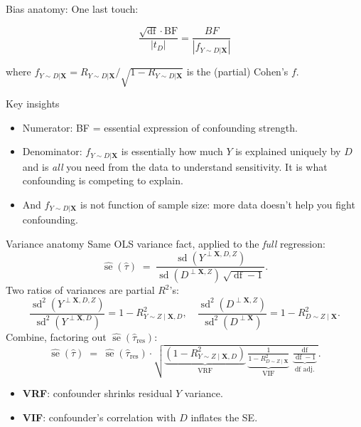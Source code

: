 \documentclass[xcolor=dvipsnames]{beamer}
\newcommand\X{{\bm X}}
\DeclareMathOperator{\sd}{sd}
\DeclareMathOperator{\se}{se}
\DeclareMathOperator{\df}{df}
\DeclareMathOperator{\bias}{bias}
\begin{document}
\begin{frame}{Bias anatomy:}
One last touch: 

\[ \frac{\sqrt{\df}\cdot \text{BF}}{|t_D|} = \frac{BF}{| f_{Y\sim D|\X}|} \]

\noindent where $f_{Y\sim D|\X} = R_{Y\sim D | \X}/\sqrt{1-R_{Y\sim D | \X}}$ is the (partial) Cohen's $f$.\\
\bigskip



  Key insights \\
\small
\begin{itemize}
\item Numerator:  BF = essential expression of confounding strength.  
\item Denominator: $f_{Y\sim D|\X}$ is essentially how much $Y$ is explained uniquely by $D$ and is \textit{all} you need from the data to understand sensitivity.  It is what confounding is competing to explain.
\item  And $f_{Y\sim D|\X}$ is not function of sample size: more data doesn't help you fight confounding.
\end{itemize}
\end{frame}


\begin{frame}{Variance anatomy}
\small
{} Same OLS variance fact, applied to the \textit{full} regression:
\[
\widehat{\se}(\hat{\tau}) \;=\; \frac{\sd(Y^{\perp \X, D, Z})}{\sd(D^{\perp \X, Z})\,\sqrt{\df - 1}}.
\]
 Two ratios of variances are partial $R^2$'s:
\[
\frac{\sd^2(Y^{\perp \X, D, Z})}{\sd^2(Y^{\perp \X, D})} = 1 - R^2_{Y\sim Z \mid \X, D}, \quad
\frac{\sd^2(D^{\perp \X, Z})}{\sd^2(D^{\perp \X})} = 1 - R^2_{D\sim Z \mid \X}.
\]
 Combine, factoring out $\widehat{\se}(\hat{\tau}_{\text{res}})$:
\[
\widehat{\se}(\hat{\tau}) \;=\; \widehat{\se}(\hat{\tau}_{\text{res}}) \cdot \sqrt{\underbrace{(1-R^2_{Y\sim Z \mid \X, D})}_{\text{VRF}}\,\underbrace{\tfrac{1}{1-R^2_{D\sim Z \mid \X}}}_{\text{VIF}}\,\underbrace{\tfrac{\df}{\df-1}}_{\text{df adj.}}}.
\]
\begin{itemize}
\item \textbf{VRF}: confounder shrinks residual $Y$ variance.
\item \textbf{VIF}: confounder's correlation with $D$ inflates the SE.
\end{itemize}
\end{frame}
\end{document}
